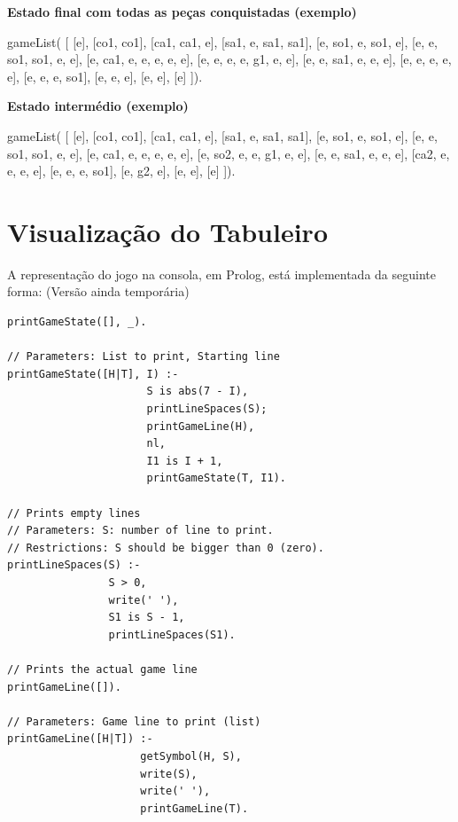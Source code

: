 \documentclass[a4paper]{article}
\begin{document}
\vspace{1cm}

\textbf{Estado final com todas as peças conquistadas (exemplo)}

gameList( [ [e], 
		[co1, co1], 
		[ca1, ca1, e],
		[sa1, e, sa1, sa1], 
          		[e, so1, e, so1, e], 
		[e, e, so1, so1, e, e], 
		[e, ca1, e, e, e, e, e],
         		[e, e, e, e, g1, e, e],
		[e, e, sa1, e, e, e], 
		[e, e, e, e, e], 
		[e, e, e, so1],
         		[e, e, e], 
		[e, e],
 		[e]  ]).

\vspace{1cm}

\textbf{Estado intermédio (exemplo)}

gameList( [ [e], 
		[co1, co1], 
		[ca1, ca1, e],
		[sa1, e, sa1, sa1], 
          		[e, so1, e, so1, e], 
		[e, e, so1, so1, e, e], 
		[e, ca1, e, e, e, e, e],
         		[e, so2, e, e, g1, e, e],
		[e, e, sa1, e, e, e], 
		[ca2, e, e, e, e], 
		[e, e, e, so1],
         		[e, g2, e], 
		[e, e],
 		[e]  ]).


\newpage




\section{Visualização do Tabuleiro}

A representação do jogo na consola, em Prolog, está implementada da seguinte forma: (Versão ainda temporária)

\begin{lstlisting}
printGameState([], _).

// Parameters: List to print, Starting line
printGameState([H|T], I) :-
                      S is abs(7 - I),
                      printLineSpaces(S);
                      printGameLine(H),
                      nl,
                      I1 is I + 1,
                      printGameState(T, I1).
                                   
// Prints empty lines
// Parameters: S: number of line to print.
// Restrictions: S should be bigger than 0 (zero).
printLineSpaces(S) :-
                S > 0,
                write(' '),
                S1 is S - 1,
                printLineSpaces(S1).

// Prints the actual game line
printGameLine([]).

// Parameters: Game line to print (list)
printGameLine([H|T]) :-
                     getSymbol(H, S),
                     write(S),
                     write(' '),
                     printGameLine(T).

\end{lstlisting}
\end{document}
